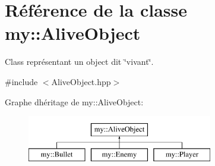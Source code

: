 \hypertarget{classmy_1_1AliveObject}{}\section{Référence de la classe my\+:\+:Alive\+Object}
\label{classmy_1_1AliveObject}


Class représentant un object dit \char`\"{}vivant\char`\"{}.  




{\ttfamily \#include $<$Alive\+Object.\+hpp$>$}

Graphe d\textquotesingle{}héritage de my\+:\+:Alive\+Object\+:\begin{figure}[H]
\begin{center}
\leavevmode
\includegraphics[height=2.000000cm]{classmy_1_1AliveObject}
\end{center}
\end{figure}
